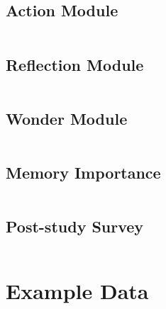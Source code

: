 \documentclass[manuscript,review,anonymous]{acmart}
\begin{document}
\subsection{Action Module}
\inputminted[breaklines, breaksymbol={},breakanywhere]{markdown}{prompts/action.txt}
\subsection{Reflection Module}
\inputminted[breaklines, breaksymbol={},breakanywhere]{markdown}{prompts/reflect.txt}
\subsection{Wonder Module}
\inputminted[breaklines, breaksymbol={},breakanywhere]{markdown}{prompts/wonder.txt}
\subsection{Memory Importance}
\inputminted[breaklines, breaksymbol={},breakanywhere]{markdown}{prompts/memory_importance.txt}
\subsection{Post-study Survey}
\inputminted[breaklines, breaksymbol={},breakanywhere]{markdown}{prompts/survey.txt}

\section{Example Data}
\label{sec:example-data}
\end{document}
